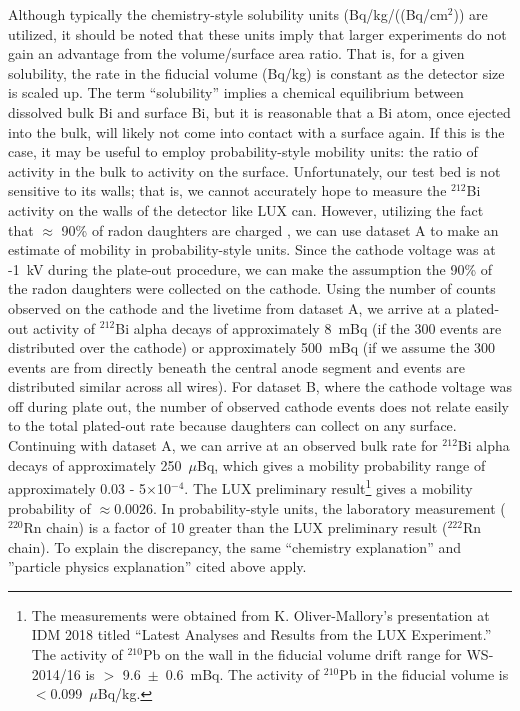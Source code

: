 Although typically the chemistry-style solubility units (Bq/kg/((Bq/cm$^{2}$)) are utilized, it should be noted that these units imply that larger experiments do not gain an advantage from the volume/surface area ratio. That is, for a given solubility, the rate in the fiducial volume (Bq/kg) is constant as the detector size is scaled up. The term ``solubility'' implies a chemical equilibrium between dissolved bulk Bi and surface Bi, but it is reasonable that a Bi atom, once ejected into the bulk, will likely not come into contact with a surface again. If this is the case, it may be useful to employ probability-style mobility units: the ratio of activity in the bulk to activity on the surface. Unfortunately, our test bed is not sensitive to its walls; that is, we cannot accurately hope to measure the $^{212}$Bi activity on the walls of the detector like \ac{LUX} can. However, utilizing the fact that $\approx$ 90\% of radon daughters are charged \cite{EXOradon}, we can use dataset A to make an estimate of mobility in probability-style units. Since the cathode voltage was at -1~kV during the plate-out procedure, we can make the assumption the 90\% of the radon daughters were collected on the cathode. Using the number of counts observed on the cathode and the livetime from dataset A, we arrive at a plated-out activity of $^{212}$Bi alpha decays of approximately 8~mBq (if the 300 events are distributed over the cathode) or approximately 500~mBq (if we assume the 300 events are from directly beneath the central anode segment and events are distributed similar across all wires). For dataset B, where the cathode voltage was off during plate out, the number of observed cathode events does not relate easily to the total plated-out rate because daughters can collect on any surface. Continuing with dataset A, we can arrive at an observed bulk rate for $^{212}$Bi alpha decays of approximately 250~$\mu$Bq, which gives a mobility probability range of approximately 0.03 - 5$\times$10$^{-4}$. The \ac{LUX} preliminary result\footnote{The measurements were obtained from K. Oliver-Mallory's presentation at IDM 2018 titled ``Latest Analyses and Results from the LUX Experiment.'' The activity of $^{210}$Pb on the wall in the fiducial volume drift range for WS-2014/16 is $>$ 9.6~$\pm$~0.6~mBq. The activity of $^{210}$Pb in the fiducial volume is $<$0.099~$\mu$Bq/kg.} gives a mobility probability of $\approx$0.0026. In probability-style units, the laboratory measurement ($^{220}$Rn chain) is a factor of 10 greater than the \ac{LUX} preliminary result ($^{222}$Rn chain). To explain the discrepancy, the same ``chemistry explanation'' and ''particle physics explanation'' cited above apply.

